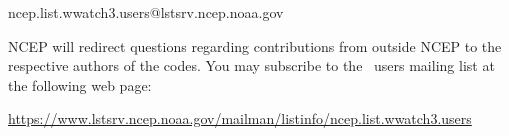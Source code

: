\begin{center}
ncep.list.wwatch3.users@lstsrv.ncep.noaa.gov
\end{center}

\noindent
NCEP will redirect questions regarding contributions from outside NCEP to the
respective authors of the codes. You may subscribe to the \ws\ users 
mailing list at the following web page:
\begin{center}
\footnotesize
\url{https://www.lstsrv.ncep.noaa.gov/mailman/listinfo/ncep.list.wwatch3.users}
\end{center} 

\nocite{tol:OMOD02b}
\nocite{tol:PACO02}
\nocite{tol:GAOS02}
\nocite{tol:OMB02b}
\nocite{tol:OMB02c}
